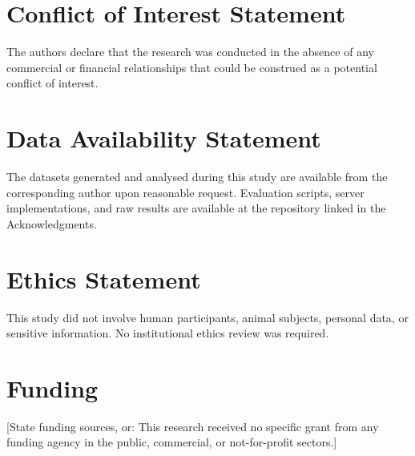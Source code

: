 \documentclass[journal]{IEEEtran}
\begin{document}
\section*{Conflict of Interest Statement}
The authors declare that the research was conducted in the absence of any
commercial or financial relationships that could be construed as a potential
conflict of interest.

\section*{Data Availability Statement}
The datasets generated and analysed during this study are available from the
corresponding author upon reasonable request. Evaluation scripts, server
implementations, and raw results are available at the repository linked in the
Acknowledgments.

\section*{Ethics Statement}
This study did not involve human participants, animal subjects, personal data,
or sensitive information. No institutional ethics review was required.

\section*{Funding}
[State funding sources, or: This research received no specific grant from any
funding agency in the public, commercial, or not-for-profit sectors.]

\balance
\end{document}
